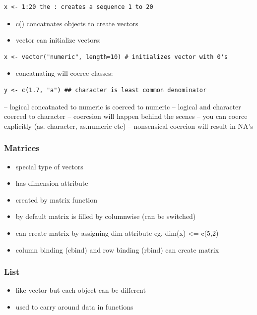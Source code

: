 \documentclass[11pt]{article}
\begin{document}
\begin{verbatim}
x <- 1:20 the : creates a sequence 1 to 20
\end{verbatim}
\begin{itemize}
\item c() concatnates objects to create vectors
\item vector can initialize vectors:
\end{itemize}

\begin{verbatim}
x <- vector("numeric", length=10) # initializes vector with 0's
\end{verbatim}
\begin{itemize}
\item concatnating will coerce classes:
\end{itemize}

\begin{verbatim}
y <- c(1.7, "a") ## character is least common denominator
\end{verbatim}
-- logical concatnated to numeric is coerced to numeric
-- logical and character coerced to character
-- coercsion will happen behind the scenes
-- you can coerce explicitly (as. character, as.numeric etc)
-- nonsensical coercion will result in NA's
\subsubsection{Matrices}
\label{sec-1-4-6}

\begin{itemize}
\item special type of vectors
\item has dimension attribute
\item created by matrix function
\item by default matrix is filled by columnwise (can be switched)
\item can create matrix by assigning dim attribute eg. dim(x) <= c(5,2)
\item column binding (cbind) and row binding (rbind) can create matrix
\end{itemize}
\subsubsection{List}
\label{sec-1-4-7}

\begin{itemize}
\item like vector but each object can be different
\item used to carry around data in functions
\end{itemize}
\end{document}

